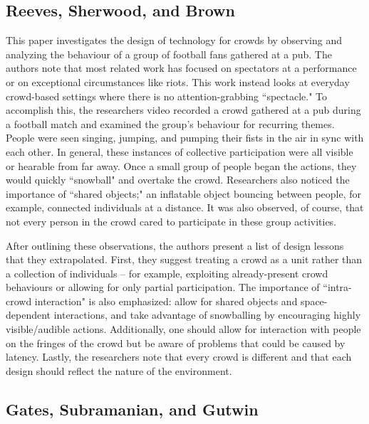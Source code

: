 \subsection{Reeves, Sherwood, and Brown}

This paper investigates the design of technology for crowds by observing and analyzing the behaviour of a group of football fans gathered at a pub. The authors note that most related work has focused on spectators at a performance or on exceptional circumstances like riots. This work instead looks at everyday crowd-based settings where there is no attention-grabbing ``spectacle." To accomplish this, the researchers video recorded a crowd gathered at a pub during a football match and examined the group's behaviour for recurring themes. People were seen singing, jumping, and pumping their fists in the air in sync with each other. In general, these instances of collective participation were all visible or hearable from far away. Once a small group of people began the actions, they would quickly ``snowball" and overtake the crowd. Researchers also noticed the importance of ``shared objects;" an inflatable object bouncing between people, for example, connected individuals at a distance. It was also observed, of course, that not every person in the crowd cared to participate in these group activities.

After outlining these observations, the authors present a list of design lessons that they extrapolated. First, they suggest treating a crowd as a unit rather than a collection of individuals -- for example, exploiting already-present crowd behaviours or allowing for only partial participation. The importance of ``intra-crowd interaction" is also emphasized: allow for shared objects and space-dependent interactions, and take advantage of snowballing by encouraging highly visible/audible actions. Additionally, one should allow for interaction with people on the fringes of the crowd but be aware of problems that could be caused by latency. Lastly, the researchers note that every crowd is different and that each design should reflect the nature of the environment.


\subsection{Gates, Subramanian, and Gutwin}


